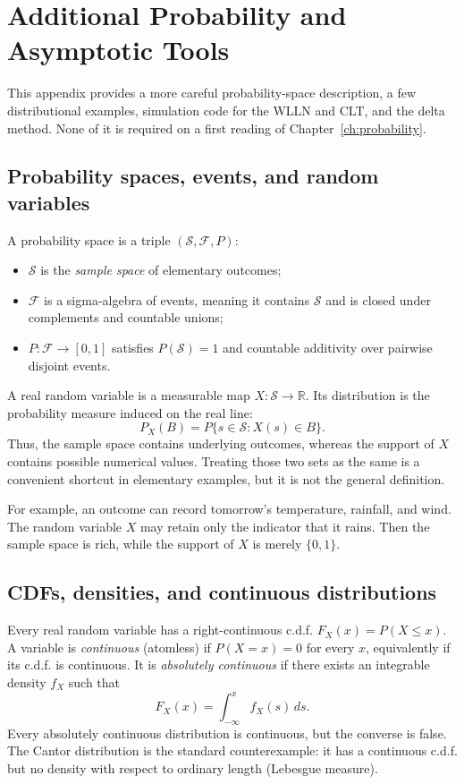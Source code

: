 \chapter{Additional Probability and Asymptotic Tools}
\label{app:probability}

This appendix provides a more careful probability-space description, a few
distributional examples, simulation code for the WLLN and CLT, and the delta
method.  None of it is required on a first reading of
Chapter~\ref{ch:probability}.

\section{Probability spaces, events, and random variables}

A probability space is a triple $(\mathcal S,\mathcal F,P)$:
\begin{itemize}
  \item $\mathcal S$ is the \emph{sample space} of elementary outcomes;
  \item $\mathcal F$ is a sigma-algebra of events, meaning it contains
        $\mathcal S$ and is closed under complements and countable unions;
  \item $P:\mathcal F\to[0,1]$ satisfies $P(\mathcal S)=1$ and countable
        additivity over pairwise disjoint events.
\end{itemize}
A real random variable is a measurable map
$X:\mathcal S\to\mathbb R$.  Its distribution is the probability measure
induced on the real line:
\[
  P_X(B)=P\{s\in\mathcal S:X(s)\in B\}.
\]
Thus, the sample space contains underlying outcomes, whereas the support of
$X$ contains possible numerical values.  Treating those two sets as the same
is a convenient shortcut in elementary examples, but it is not the general
definition.

For example, an outcome can record tomorrow's temperature, rainfall, and
wind.  The random variable $X$ may retain only the indicator that it rains.
Then the sample space is rich, while the support of $X$ is merely $\{0,1\}$.

\section{CDFs, densities, and continuous distributions}

Every real random variable has a right-continuous c.d.f.
$F_X(x)=P(X\leq x)$.  A variable is \emph{continuous} (atomless) if
$P(X=x)=0$ for every $x$, equivalently if its c.d.f. is continuous.  It is
\emph{absolutely continuous} if there exists an integrable density $f_X$
such that
\[
  F_X(x)=\int_{-\infty}^{x}f_X(s)\,ds.
\]
Every absolutely continuous distribution is continuous, but the converse is
false.  The Cantor distribution is the standard counterexample: it has a
continuous c.d.f. but no density with respect to ordinary length (Lebesgue
measure).

